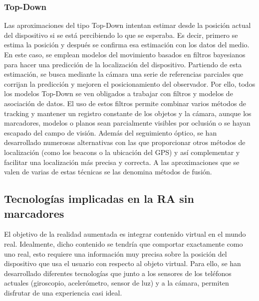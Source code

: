 \subsubsection{Top-Down}
Las aproximaciones del tipo Top-Down intentan estimar desde la posición actual del dispositivo si se está percibiendo lo que se esperaba. Es decir, primero se estima la posición y después se confirma esa estimación con los datos del medio.
En este caso, se emplean modelos del movimiento basados en filtros bayesianos para hacer una predicción de la localización del dispositivo. Partiendo de esta estimación, se busca mediante la cámara una serie de referencias parciales que corrijan la predicción y mejoren el posicionamiento del observador. Por ello, todos los modelos Top-Down se ven obligados a trabajar con filtros y modelos de asociación de datos.
El uso de estos filtros permite combinar varios métodos de tracking y mantener un registro constante de los objetos y la cámara, aunque los marcadores, modelos o planos sean parcialmente visibles por oclusión o se hayan escapado del campo de visión.
Además del seguimiento óptico, se han desarrollado numerosas alternativas con las que proporcionar otros métodos de localización (como los beacons o la ubicación del GPS) y así complementar y facilitar una localización más precisa y correcta. A las aproximaciones que se valen de varias de estas técnicas se las denomina métodos de fusión.

\subsection{Tecnologías implicadas en la RA sin marcadores}
El objetivo de la realidad aumentada es integrar contenido virtual en el mundo real. Idealmente, dicho contenido se tendría que comportar exactamente como uno real, esto requiere una información muy precisa sobre la posición del dispositivo que usa el usuario con respecto al objeto virtual. Para ello, se han desarrollado diferentes tecnologías que junto a los sensores de los teléfonos actuales (giroscopio, acelerómetro, sensor de luz) y a la cámara, permiten disfrutar de una experiencia casi ideal. \cite{ARCarmigniani} 

